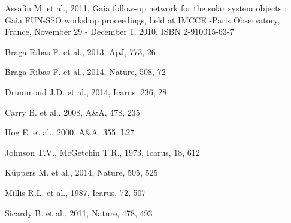 \documentclass[useAMS,usenatbib]{mn2e}
\begin{document}
\begin{thebibliography}{99}

 Assafin M. et al., 2011, Gaia follow-up network for the solar system objects : Gaia FUN-SSO workshop proceedings, held at IMCCE -Paris Observatory, France, November 29 - December 1, 2010. ISBN 2-910015-63-7


 Braga-Ribas F. et al., 2013,
ApJ, 773, 26

 Braga-Ribas F. et al., 2014,
Nature, 508, 72

 Drummond J.D. et al., 2014,
Icarus, 236, 28

 Carry B. et al., 2008,
A\&A, 478, 235

 Hog E. et al., 2000,
A\&A, 355, L27

 Johnson T.V., McGetchin T.R., 1973,
Icarus, 18, 612

 K\"{u}ppers M. et al., 2014,
Nature, 505, 525

 Millis R.L. et al., 1987,
Icarus, 72, 507


 Sicardy B. et al., 2011,
Nature, 478, 493


\end{thebibliography}
\end{document}
